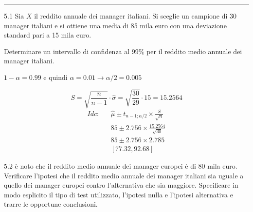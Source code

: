 \documentclass[
  11pt,
]{book}
\theoremstyle{mytheoremstyle}
\theoremstyle{mydefstyle}
\newenvironment{sol}
  {
  \begin{tcolorbox}[enhanced,breakable,arc=0.1mm,boxrule=1pt,colback=white,colframe=iblue,
  title=\bf \fontfamily{lmss}\selectfont \hspace{.5 cm} Soluzione,drop fuzzy shadow]

}{
\end{tcolorbox}
  }
\begin{document}
\begin{center}\rule{0.5\linewidth}{0.5pt}\end{center}

5.1 Sia \(X\) il reddito annuale dei manager italiani.
Si sceglie un campione di 30 manager italiani e si ottiene una
media di 85 mila euro con una deviazione standard pari a 15 mila euro.

Determinare un intervallo di confidenza al 99\% per
il reddito medio annuale dei manager italiani.

\begin{sol}
\(1-\alpha =0.99\) e quindi \(\alpha=0.01\rightarrow \alpha/2=0.005\)

\[
      S  =\sqrt{\frac {n}{n-1}}\cdot\hat\sigma =
     \sqrt{\frac { 30 }{ 29 }}\cdot 15 = 15.2564 
\]
\begin{eqnarray*}
  Idc: & &  \hat\mu \pm  t_{n-1;\alpha/2} \times \frac{S}{\sqrt{n}} \\
     & &  85 \pm  2.756 \times \frac{ 15.2564 }{\sqrt{ 30 }} \\
     & &  85 \pm  2.756 \times  2.785 \\
     & & [ 77.32 ,  92.68 ]
\end{eqnarray*}

\end{sol}

5.2 è noto che il reddito medio annuale dei manager europei
è di 80 mila euro.
Verificare l'ipotesi
che il reddito medio annuale dei manager italiani sia uguale a quello
dei manager europei contro l'alternativa che sia maggiore.
Specificare in modo esplicito il tipo di test utilizzato,
l'ipotesi nulla e l'ipotesi alternativa e trarre le opportune
conclusioni.
\end{document}
